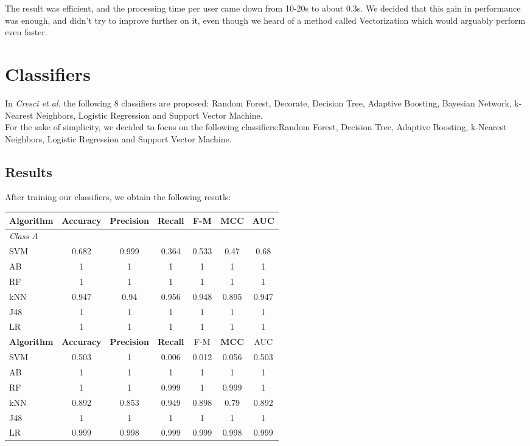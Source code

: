 \documentclass[a4paper,11pt]{article}
\begin{document}
The result was efficient, and the processing time per user came down from 10-20s to about 0.3s. We decided that this gain in performance was enough, and didn't try to improve further on it, even though we heard of a method called Vectorization which would arguably perform even faster.

\section{Classifiers}
In \textit{Cresci et al.} the following 8 classifiers are proposed: Random Forest, Decorate, Decision Tree, Adaptive Boosting, Bayesian Network, k-Nearest Neighbors, Logistic Regression and Support Vector Machine.\\

For the sake of simplicity, we decided to focus on the following classifiers:Random Forest,  Decision Tree, Adaptive Boosting, k-Nearest Neighbors, Logistic Regression and Support Vector Machine.\\

\subsection{Results}
After training our classifiers, we obtain the following resutls:

\begin{tabular}{lcccccc}
	\hline
	\textbf{Algorithm} 	& \textbf{Accuracy} 	& \textbf{Precision} & \textbf{Recall} & F-M 	& \textbf{MCC} & AUC\\
	\hline
	\textit{Class A}\\
	SVM			&	0.682	&	0.999	&	0.364	&0.533 & 0.47 & 0.68\\
	AB			&	1		&	1		&	1		& 1 	&	1	& 1   \\
	RF			&	1		&	1		&	1		& 1   	&	1	& 1  \\
	kNN			&	0.947	&	0.94	&	0.956	& 0.948 & 0.895 & 0.947\\
	J48			&	1		&	1		&	1		& 1 	&	1	& 1   \\
	LR			&	1		&	1		&	1		& 1 	&	1	& 1   \\
	\hline
	\textbf{Algorithm} 	& \textbf{Accuracy} 	& \textbf{Precision} & \textbf{Recall} & F-M 	& \textbf{MCC} & AUC\\
	\hline
	SVM			&	0.503	&	1	&	0.006	& 0.012 & 0.056 & 0.503\\
	AB			&	1		&	1		&	1		& 1 	&	1	& 1   \\
	RF			&	1		&	1		&	0.999		& 1   	&	0.999	& 1  \\
	kNN			&	0.892	&	0.853	&	0.949	& 0.898 & 0.79 & 0.892\\
	J48			&	1		&	1		&	1		& 1 	&	1	& 1   \\
	LR			&	0.999		&	0.998		&	0.999		& 0.999 	&	0.998	& 0.999   \\
	
	
\end{tabular}
\end{document}

